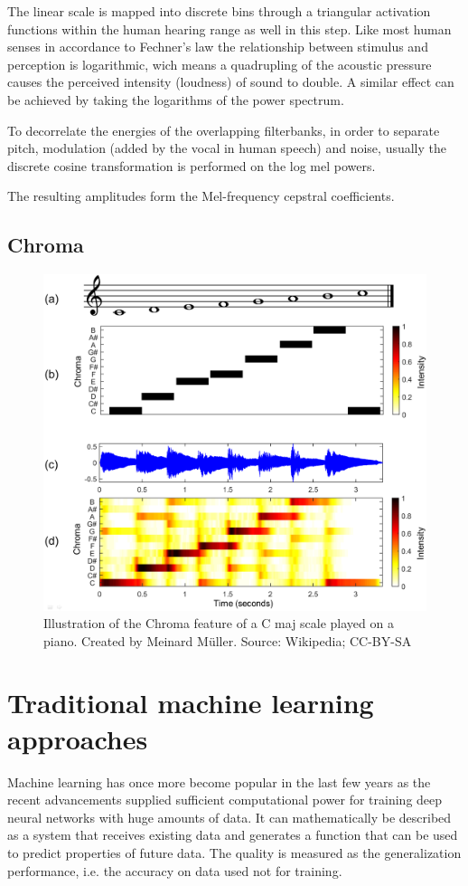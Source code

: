  
 The linear scale is mapped into discrete bins through a triangular activation functions within the human hearing range as well in this step. Like most human senses in accordance to Fechner’s law \cite{fechner1860} the relationship between stimulus and perception is logarithmic, wich means a quadrupling of the acoustic pressure causes the perceived intensity (loudness) of sound to double. A similar effect can be achieved by taking the logarithms of the power spectrum.
 

 To decorrelate the energies of the overlapping filterbanks, in order to separate pitch, modulation (added by the vocal in human speech) and noise, usually the discrete cosine transformation is performed on the log mel powers. %
 
 The resulting amplitudes form the Mel-frequency cepstral coefficients.

\subsection{Chroma}


\begin{figure}[h!]
    \centering
	\includegraphics[width=.6\textwidth]{./images/illustrations/chroma}
    \caption{Illustration of the Chroma feature of a C maj scale played on a piano. Created by Meinard Müller. Source: Wikipedia; CC-BY-SA}
    \label{fig:chroma}
\end{figure}



\section{Traditional machine learning approaches}


Machine learning has once more become popular in the last few years as the recent advancements supplied sufficient computational power for training deep neural networks with huge amounts of data.
It can mathematically be described as a system that receives existing data and generates a function that can be used to predict properties of future data.
The quality is measured as the generalization performance, i.e. the accuracy on data used not for training.

